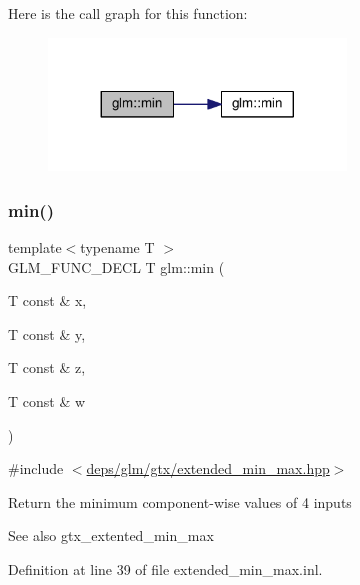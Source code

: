 Here is the call graph for this function\+:
\nopagebreak
\begin{figure}[H]
\begin{center}
\leavevmode
\includegraphics[width=224pt]{df/d72/group__gtx__extended__min__max_ga42b5c3fc027fd3d9a50d2ccc9126d9f0_cgraph}
\end{center}
\end{figure}
\mbox{\label{group__gtx__extended__min__max_ga95466987024d03039607f09e69813d69}} 
\subsubsection{\texorpdfstring{min()}{min()}\hspace{0.1cm}{\footnotesize\ttfamily [4/6]}}
{\footnotesize\ttfamily template$<$typename T $>$ \\
G\+L\+M\+\_\+\+F\+U\+N\+C\+\_\+\+D\+E\+CL T glm\+::min (\begin{DoxyParamCaption}\item[{T const \&}]{x,  }\item[{T const \&}]{y,  }\item[{T const \&}]{z,  }\item[{T const \&}]{w }\end{DoxyParamCaption})}



{\ttfamily \#include $<$\hyperlink{extended__min__max_8hpp}{deps/glm/gtx/extended\+\_\+min\+\_\+max.\+hpp}$>$}

Return the minimum component-\/wise values of 4 inputs \begin{DoxySeeAlso}{See also}
gtx\+\_\+extented\+\_\+min\+\_\+max 
\end{DoxySeeAlso}


Definition at line 39 of file extended\+\_\+min\+\_\+max.\+inl.

